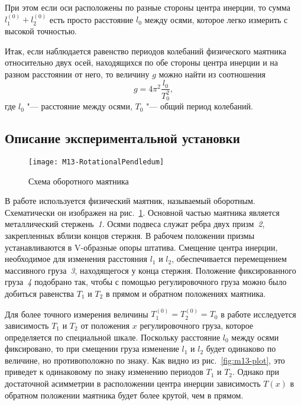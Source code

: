 \documentclass[a4paper, 12pt]{extarticle}
\begin{document}
При этом если оси расположены по разные стороны центра инерции, то сумма $l_1^{(0)} +l_2^{(0)}$ есть просто расстояние $l_0$ между осями, которое легко измерить с высокой точностью.

Итак, если наблюдается равенство периодов колебаний физического маятника относительно двух осей, находящихся по обе стороны центра инерции и на разном расстоянии от него, то величину $g$ можно найти из соотношения
\begin{equation}
\label{eq:m13-g-3}
g = 4 \pi^2 \frac{l_0}{T_0^2},
\end{equation}
где $l_0$  "--- расстояние между осями, $T_0$ "--- общий период колебаний.

\subsection{Описание экспериментальной установки}

\begin{figure}[h]
\begin{center}
\texttt{[image: M13-RotationalPendledum]}
\end{center}
\caption{Схема оборотного маятника \label{fig:m13-pendulum}}
\end{figure}

В работе используется физический маятник, называемый оборотным. Схематически он изображен на рис.~\ref{fig:m13-pendulum}. Основной частью маятника является металлический стержень~\emph{1}. Осями подвеса служат ребра двух призм~\emph{2}, закрепленных вблизи концов стержня. В рабочем положении призмы устанавливаются в V-образные опоры штатива. %
Смещение центра инерции, необходимое для изменения расстояния $l_1$ и $l_2$,  обеспечивается перемещением массивного груза~\emph{3}, находящегося у конца стержня. Положение фиксированного груза~\emph{4} подобрано так, чтобы с помощью регулировочного груза можно было добиться равенства $T_1$ и $T_2$ в прямом и обратном положениях маятника.

Для более точного измерения величины $T_1^{(0)} = T_2^{(0)} = T_0$ в работе исследуется зависимость $T_1$ и $T_2$ от положения $x$ регулировочного груза, которое определяется по специальной шкале. Поскольку расстояние $l_0$ между осями фиксировано, то при смещении груза изменение $l_1$ и $l_2$ будет одинаково по величине, но противоположно по знаку. Как видно из рис.~\ref{fig:m13-plot}, это приведет к одинаковому по знаку изменению периодов $T_1$ и $T_2$. Однако при достаточной асимметрии в расположении центра инерции зависимость $T(x)$ в обратном положении маятника будет более крутой, чем в прямом. %
\end{document}
